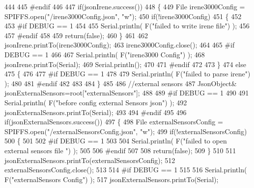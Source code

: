 \begin{DoxyCode}
444 
445 \textcolor{preprocessor}{#endif }
446 
447     \textcolor{keywordflow}{if}(jsonIrene.success())
448     \{
449         File irene3000Config = SPIFFS.open(\textcolor{stringliteral}{"/irene3000Config.json"}, \textcolor{stringliteral}{"w"});   
450         \textcolor{keywordflow}{if}(!irene3000Config)
451         \{
452 
453 \textcolor{preprocessor}{        #if DEBUG == 1 }
454 
455             Serial.println( F(\textcolor{stringliteral}{"failed to write irene file"}) );
456         
457 \textcolor{preprocessor}{        #endif}
458 
459             \textcolor{keywordflow}{return}(\textcolor{keyword}{false});
460         \}
461 
462         jsonIrene.printTo(irene3000Config);
463         irene3000Config.close();
464     
465 \textcolor{preprocessor}{    #if DEBUG == 1 }
466         
467         Serial.println( F(\textcolor{stringliteral}{"irene3000 Config"}) );
468         jsonIrene.printTo(Serial);
469         Serial.println();
470     
471 \textcolor{preprocessor}{    #endif}
472     
473     \}
474     \textcolor{keywordflow}{else}
475     \{
476     
477 \textcolor{preprocessor}{    #if DEBUG == 1 }
478 
479         Serial.println( F(\textcolor{stringliteral}{"failed to parse irene"}) );   
480     
481 \textcolor{preprocessor}{    #endif }
482 
483 
484     \}
485     
486     \textcolor{comment}{//external sensors}
487         JsonObject& jsonExternalSensors=root[\textcolor{stringliteral}{"externalSensors"}];
488 
489 \textcolor{preprocessor}{#if DEBUG == 1 }
490 
491     Serial.println( F(\textcolor{stringliteral}{"before config external Sensors json"}) );
492     jsonExternalSensors.printTo(Serial);
493 
494 \textcolor{preprocessor}{#endif}
495 
496     \textcolor{keywordflow}{if}(jsonExternalSensors.success())
497     \{
498         File externalSensorsConfig = SPIFFS.open(\textcolor{stringliteral}{"/externalSensorsConfig.json"}, \textcolor{stringliteral}{"w"});   
499         \textcolor{keywordflow}{if}(!externalSensorsConfig)
500         \{
501         
502 \textcolor{preprocessor}{        #if DEBUG == 1 }
503 
504             Serial.println( F(\textcolor{stringliteral}{"failed to open external sensors file "}) );
505         
506 \textcolor{preprocessor}{        #endif }
507 
508             \textcolor{keywordflow}{return}(\textcolor{keyword}{false});
509         \}
510 
511         jsonExternalSensors.printTo(externalSensorsConfig); 
512         externalSensorsConfig.close();
513 
514 \textcolor{preprocessor}{#if DEBUG == 1 }
515         
516         Serial.println( F(\textcolor{stringliteral}{"externalSensors Config"}) );
517         jsonExternalSensors.printTo(Serial);

\end{DoxyCode}

